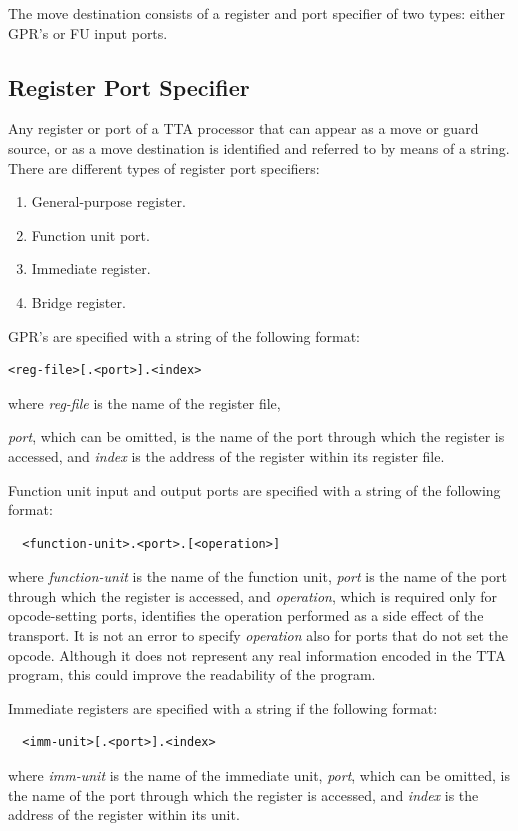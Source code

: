 \documentclass[a4paper,twoside]{tceusermanual}
\begin{document}
The move destination consists of a register and port specifier of two types:
either GPR's or FU input ports.

\subsection{Register Port Specifier}
\label{ssec:move-terminal}

Any register or port of a TTA processor that can appear as a move or guard
source, or as a move destination is identified and referred to by means of a
string.
%
There are different types of register port specifiers:
\begin{enumerate}
\item %
  General-purpose register.
\item %
  Function unit port.
\item %
  Immediate register.
\item %
  Bridge register.
\end{enumerate}

GPR's are specified with a string of the following format:
\begin{verbatim}
<reg-file>[.<port>].<index>
\end{verbatim}

where \emph{reg-file} is the name of the register file,

\emph{port}, which can be omitted, is the name of the port through which the
register is accessed, and \emph{index} is the address of the register within
its register file.

Function unit input and output ports are specified with a string of the
following format:

\begin{verbatim}
  <function-unit>.<port>.[<operation>]
\end{verbatim}

where \emph{function-unit} is the name of the function unit, \emph{port} is
the name of the port through which the register is accessed, and
\emph{operation}, which is required only for opcode-setting ports,
identifies the operation performed as a side effect of the transport.
%
It is not an error to specify \emph{operation} also for ports that do not
set the opcode.  Although it does not represent any real information encoded
in the TTA program, this could improve the readability of the program.

Immediate registers are specified with a string if the following format:
\begin{verbatim}
  <imm-unit>[.<port>].<index>
\end{verbatim}
where \emph{imm-unit} is the name of the immediate unit,
%
%
\emph{port}, which can be omitted, is the name of the port through which the
register is accessed, and \emph{index} is the address of the register within
its unit.
\end{document}

